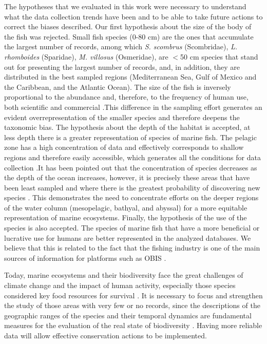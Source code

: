 \documentclass[12pt,authoryear]{elsarticle}
\begin{document}
The hypotheses that we evaluated in this work were necessary to understand what the data collection trends have been and to be able to take future actions to correct the biases described. Our first hypothesis about the size of the body of the fish was rejected. Small fish species (0-80 cm) are the ones that accumulate the largest number of records, among which \textit{S. scombrus }(Scombridae),\textit{ L. rhomboides }(Sparidae), \textit{M. villosus} (Osmeridae), are \(<\)50 cm species that stand out for presenting the largest number of records, and, in addition, they are distributed in the best sampled regions (Mediterranean Sea, Gulf of Mexico and the Caribbean, and the Atlantic Ocean). The size of the fish is inversely proportional to the abundance and, therefore, to the frequency of human use, both scientific and commercial \citep{pauly2005}.This difference in the sampling effort generates an evident overrepresentation of the smaller species and therefore deepens the taxonomic bias. The hypothesis about the depth of the habitat is accepted, at less depth there is a greater representation of species of marine fish. The pelagic zone has a high concentration of data and effectively corresponds to shallow regions and therefore easily accessible, which generates all the conditions for data collection \citep{melo2020}.It has been pointed out that the concentration of species decreases as the depth of the ocean increases, however, it is precisely these areas that have been least sampled and where there is the greatest probability of discovering new species \citep{costello2017marine}. This demonstrates the need to concentrate efforts on the deeper regions of the water column (mesopelagic, bathyal, and abyssal) for a more equitable representation of marine ecosystems. Finally, the hypothesis of the use of the species is also accepted. The species of marine fish that have a more beneficial or lucrative use for humans are better represented in the analyzed databases. We believe that this is related to the fact that the fishing industry is one of the main sources of information for platforms such as OBIS \citep{zhang2002}.

Today, marine ecosystems and their biodiversity face the great challenges of climate change and the impact of human activity, especially those species considered key food resources for survival \citep{hollowed2013,ramirez2017climate,ohara2021}. It is necessary to focus and strengthen the study of those areas with very few or no records, since the descriptions of the geographic ranges of the species and their temporal dynamics are fundamental measures for the evaluation of the real state of biodiversity \citep{lenoir2020species, oliver2021}. Having more reliable data will allow effective conservation actions to be implemented.
\end{document}
